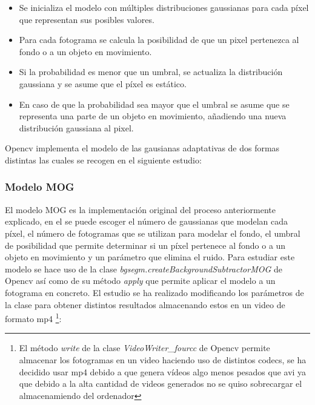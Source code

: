 \documentclass[a4paper,12pt]{article}
\begin{document}
{\vspace{0.5cm}

\begin{itemize}
    \item Se inicializa el modelo con múltiples distribuciones gaussianas para cada píxel que representan sus posibles valores.
    \item Para cada fotograma se calcula la posibilidad de que un pixel pertenezca al fondo o a un objeto en movimiento.
    \item Si la probabilidad es menor que un umbral, se actualiza la distribución gaussiana y se asume que el píxel es estático.
    \item En caso de que la probabilidad sea mayor que el umbral se asume que se representa una parte de un objeto en movimiento, añadiendo una nueva distribución gaussiana al pixel.
\end{itemize}

\vspace{0.5cm}

Opencv implementa el modelo de las gausianas adaptativas de dos formas distintas las cuales se recogen en el siguiente estudio:

\vspace{0.5cm}

\subsubsection{Modelo MOG}

\vspace{0.5cm}

El modelo MOG es la implementación original del proceso anteriormente explicado, en el se puede escoger el número de gaussianas que modelan cada píxel, el número de fotogramas
que se utilizan para modelar el fondo, el umbral de posibilidad que permite determinar si un píxel pertenece al fondo o a un objeto en movimiento y un parámetro que elimina el ruido. 
Para estudiar este modelo se hace uso de la clase \textit{bgsegm.createBackgroundSubtractorMOG} de Opencv así como de su método \textit{apply} que permite aplicar el modelo a un 
fotograma en concreto. El estudio se ha realizado modificando los parámetros de la clase para obtener distintos resultados almacenando estos en un video de formato mp4
\footnote{El método \textit{write} de la clase \textit{VideoWriter\_fourcc} de Opencv permite almacenar los fotogramas en un video haciendo uso de distintos codecs,
se ha decidido usar mp4 debido a que genera vídeos algo menos pesados que avi ya que debido a la alta cantidad de videos generados no se quiso sobrecargar el almacenamiendo del ordenador}:

}
\end{document}
